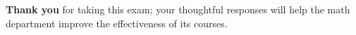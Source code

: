 \documentclass{article}
\begin{document}
\textbf{Thank you} for taking this exam; your thoughtful responses
will help the math department improve the effectiveness of its
courses.
\end{document}
